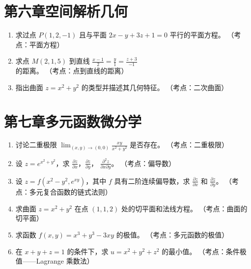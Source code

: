 \documentclass[12pt,a4paper]{ctexart}
\begin{document}
\section*{第六章\quad 空间解析几何}

\begin{enumerate}[leftmargin=*,label=\arabic*.,start=32]
  \item 求过点 $P(1,2,-1)$ 且与平面 $2x - y + 3z + 1 = 0$ 平行的平面方程。
    （考点：平面方程）

  \item 求点 $M(2,1,5)$ 到直线 $\frac{x-1}{2} = \frac{y}{1} = \frac{z+3}{-1}$ 的距离。
    （考点：点到直线的距离）

  \item 指出曲面 $z = x^2 + y^2$ 的类型并描述其几何特征。
    （考点：二次曲面）
\end{enumerate}

\section*{第七章\quad 多元函数微分学}

\begin{enumerate}[leftmargin=*,label=\arabic*.,start=35]
  \item 讨论二重极限 $\displaystyle\lim_{(x,y)\to(0,0)}\frac{xy}{x^2+y^2}$ 是否存在。
    （考点：二重极限）

  \item 设 $z = e^{x^2+y^2}$，求 $\frac{\partial z}{\partial x}$，$\frac{\partial z}{\partial y}$，
    $\frac{\partial^2 z}{\partial x \partial y}$。
    （考点：偏导数）

  \item 设 $z = f(x^2-y^2, e^{xy})$，其中 $f$ 具有二阶连续偏导数，求
    $\frac{\partial z}{\partial x}$ 和 $\frac{\partial z}{\partial y}$。
    （考点：多元复合函数的链式法则）

  \item 求曲面 $z = x^2 + y^2$ 在点 $(1,1,2)$ 处的切平面和法线方程。
    （考点：曲面的切平面）

  \item 求函数 $f(x,y) = x^3 + y^3 - 3xy$ 的极值。
    （考点：多元函数的极值）

  \item 在 $x + y + z = 1$ 的条件下，求 $u = x^2 + y^2 + z^2$ 的最小值。
    （考点：条件极值——Lagrange 乘数法）
\end{enumerate}
\end{document}
